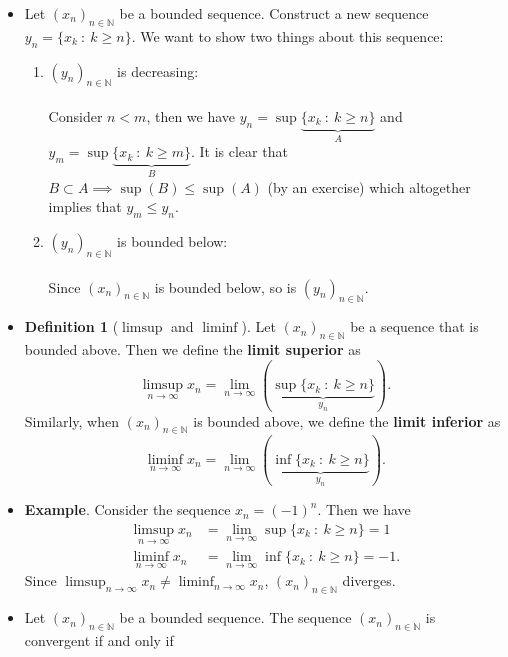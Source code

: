 \documentclass{article}
\newcommand{\N}{\mathbb{N}}
\newcommand{\seq}[2]{(#1_{#2})_{#2 \in \N}}
\newcommand{\mylimmm}[2]{\lim\limits_{#1 \to #2}}
\newcommand{\?}{\stackrel{?}{=}}
\theoremstyle{definition} %
\newtheorem{definition}[subsection]{Definition} %
\begin{document}
\begin{itemize}
    \item Let $\seq{x}{n}$ be a bounded sequence. Construct a new sequence $y_n = \{x_k \ : \ k \geq n\}$. We want to show two things about this sequence:
          \begin{enumerate}[label=(\arabic*)]
              \item $\seq{y}{n}$ is decreasing: \\\\
                    Consider $n < m$, then we have $y_n = \sup\underbrace{\{x_k \ : \ k \geq n\}}_{A}$ and $y_m = \sup\underbrace{\{x_k \ : \ k \geq m\}}_{B}$. It is clear that $B \subset A \implies \sup(B) \leq \sup(A)$ (by an exercise) which altogether implies that $y_m \leq y_n$.
              \item $\seq{y}{n}$ is bounded below: \\\\
                    Since $\seq{x}{n}$ is bounded below, so is $\seq{y}{n}$.
          \end{enumerate}
    \item[]
          \begin{definition}[$\limsup$ and $\liminf$]
              Let $\seq{x}{n}$ be a sequence that is bounded above. Then we define the \textbf{limit superior} as
              $$\limsup_{n \to \infty} x_n = \mylimmm{n}{\infty} \left(\underbrace{\sup\{x_k \ : \ k \geq n\}}_{y_n}\right).$$
              Similarly, when $\seq{x}{n}$ is bounded above, we define the \textbf{limit inferior} as
              $$\liminf_{n \to \infty} x_n = \mylimmm{n}{\infty} \left(\underbrace{\inf\{x_k \ : \ k \geq n\}}_{y_n}\right).$$
          \end{definition}
    \item \textbf{Example}. Consider the sequence $x_n = (-1)^n$. Then we have
          \begin{align*}
              \limsup_{n \to \infty} x_n & = \mylimmm{n}{\infty} \sup\{x_k \ : \ k \geq n\} = 1   \\
              \liminf_{n \to \infty} x_n & = \mylimmm{n}{\infty} \inf\{x_k \ : \ k \geq n\} = -1.
          \end{align*}
          Since $\limsup_{n \to \infty} x_n \neq \liminf_{n \to \infty} x_n$, $\seq{x}{n}$ diverges.
    \item[]
          \begin{theorem}
              Let $\seq{x}{n}$ be a bounded sequence. The sequence $\seq{x}{n}$ is convergent if and only if

\end{theorem}
\end{itemize}
\end{document}
